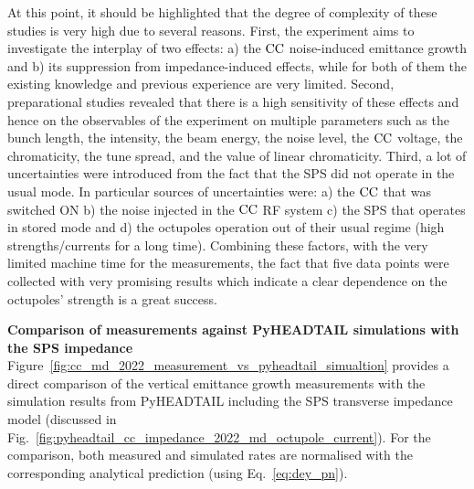 At this point, it should be highlighted that the degree of complexity of these studies is very high due to several reasons. First, the experiment aims to investigate the interplay of two effects: a) the ${\mathrm{CC}}$ noise-induced emittance growth and b) its suppression from impedance-induced effects, while for both of them the existing knowledge and previous experience are very limited.%
Second, preparational studies revealed that there is a high sensitivity of these effects and hence on the observables of the experiment on multiple parameters such as the bunch length, the intensity, the beam energy, the noise level, the ${\mathrm{CC}}$ voltage, the chromaticity, the tune spread, and the value of linear chromaticity. Third, a lot of uncertainties were introduced from the fact that the SPS did not operate in the usual mode.  In particular sources of uncertainties were: a) the ${\mathrm{CC}}$ that was switched ON b) the noise injected in the ${\mathrm{CC}}$ RF system c) the SPS that operates in stored mode and d) the octupoles operation out of their usual regime (high strengths/currents for a long time). %
Combining these factors, with the very limited machine time for the measurements, the fact that five data points were collected with very promising results which indicate a clear dependence on the octupoles' strength is a great success.


\textbf{Comparison of measurements against PyHEADTAIL simulations with the SPS impedance}\\

Figure~\ref{fig:cc_md_2022_measurement_vs_pyheadtail_simualtion} provides a direct comparison of the vertical emittance growth measurements with the simulation results from PyHEADTAIL including the SPS transverse impedance model (discussed in Fig.~\ref{fig:pyheadtail_cc_impedance_2022_md_octupole_current}). For the comparison, both measured and simulated rates are normalised with the corresponding analytical prediction (using Eq.~\eqref{eq:dey_pn}). 

